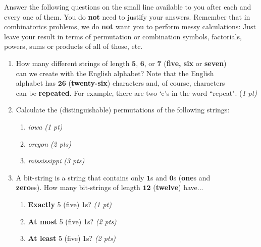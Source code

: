 \documentclass[letterpaper,10pt]{article}
\begin{document}
{


{\large Answer the following questions on the small line available to you after each and every one of them. You do {\bf not} need to justify your answers. Remember that in combinatorics problems, we do {\bf not} want you to perform messy calculations: Just leave your result in terms of permutation or combination symbols, factorials, powers, sums or products of all of those, etc.

\vspace{.1in} 
\begin{enumerate}[label=(\alph*)]
		\item \doublespacing How many different strings of length $\mathbf 5$, $\mathbf 6$, or $\mathbf 7$ ({\bf five, six} or \textbf{seven}) \\ can we create with the English alphabet? Note that the English \\ alphabet has $\mathbf{26}$ (\textbf{twenty-six}) characters and, of course, characters \\ can be \textbf{repeated}.  For example, there are two `e's in the word ``repeat". \null\hfill \myline{1in} {(\em 1 pt)}
	\item Calculate the (distinguishable) permutations of the following strings:
		\begin{enumerate}[label=(\roman*)]
				  \setlength\itemsep{0.6em}
			\item {\em iowa } \null\hfill \myline{1in} {\em(1 pt)}
			\item {\em oregon} \null\hfill \myline{1in} {\em(2 pts)}
			\item {\em mississippi} \null\hfill \myline{1in} {\em (3 pts)}
		\end{enumerate}
		\item A bit-string is a string that contains only $\mathbf{1}$s and $\mathbf{0}$s ({\bf one}s and \\ {\bf zero}es).  How many bit-strings of length $\mathbf{12}$ (\textbf{twelve}) have...
	\begin{enumerate}[label=(\roman*)]  \setlength\itemsep{0.6em}
	  	\item \textbf{Exactly} 5 (five) 1s? \null\hfill \myline{1in} {\em (1 pt)}
		\item \textbf{At most} 5 (five) 1s? \null\hfill \myline{0.9in} { \em (2 pts)}
		\item \textbf{At least} 5 (five) 1s? \null\hfill \myline{1in} {\em (2 pts)}

\end{enumerate}
\end{enumerate}}}
\end{document}
